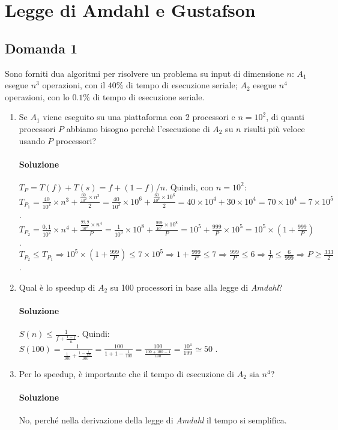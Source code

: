 \section{Legge di Amdahl e Gustafson}

\subsection{Domanda 1}
Sono forniti dua algoritmi per risolvere un problema su input di dimensione $n$: $A_1$ esegue $n^3$ operazioni, con il $40\%$ di tempo di esecuzione seriale; $A_2$ esegue $n^4$ operazioni, con lo $0.1\%$ di tempo di esecuzione seriale.
\begin{enumerate}
	\item Se $A_1$ viene eseguito su una piattaforma con 2 processori e $n = 10^2$, di quanti processori $P$ abbiamo bisogno perch\`{e} l'esecuzione di $A_2$ su $n$ risulti più veloce usando $P$ processori?
	\paragraph{Soluzione}
	$T_P = T(f) + T(s) = f + (1-f)/n$. 	Quindi, con $n = 10^2$: \\
	$T_{P_1} = \frac{40}{10^2}\times n^3 + \frac{\frac{60}{10^2}\times n^3}{2} = \frac{40}{10^2}\times 10^6 + \frac{\frac{60}{10^2}\times 10^6}{2} = 40\times 10^4 + 30\times 10^4 = 70\times 10^4 = 7\times 10^5$ .\\
	$T_{P_2} = \frac{0,1}{10^2}\times n^4 + \frac{\frac{99,9}{10^2}\times n^4}{P} = \frac{1}{10^3}\times 10^8 +  \frac{\frac{999}{10^3}\times 10^8}{P} = 10^5 + \frac{999}{P}\times 10^5 = 10^5\times(1 + \frac{999}{P})$ . \\
	$T_{P_2} \leq T_{P_1} \Rightarrow 10^5\times(1 + \frac{999}{P}) \leq 7\times 10^5 \Rightarrow 1 + \frac{999}{P} \leq 7 \Rightarrow \frac{999}{P} \leq 6 \Rightarrow \frac{1}{P} \leq \frac{6}{999} \Rightarrow P \geq \frac{333}{2}$ .
	\item Qual è lo speedup di $A_2$ su 100 processori in base alla legge di \textit{Amdahl}?
	\paragraph{Soluzione}
	$S(n) \leq \frac{1}{f + \frac{1-f}{n}}$. Quindi: \\
	$S(100) = \frac{1}{\frac{1}{100}+ \frac{1 - \frac{1}{100}}{100}} = \frac{100}{1 + 1 - \frac{1}{100}} = \frac{100}{\frac{100 + 100 - 1}{100}} = \frac{10^4}{199} \simeq 50$ .
	\item Per lo speedup, è importante che il tempo di esecuzione di $A_2$ sia $n^4$?
	\paragraph{Soluzione}
	No, perché nella derivazione della legge di \textit{Amdahl} il tempo si semplifica.
\end{enumerate}

